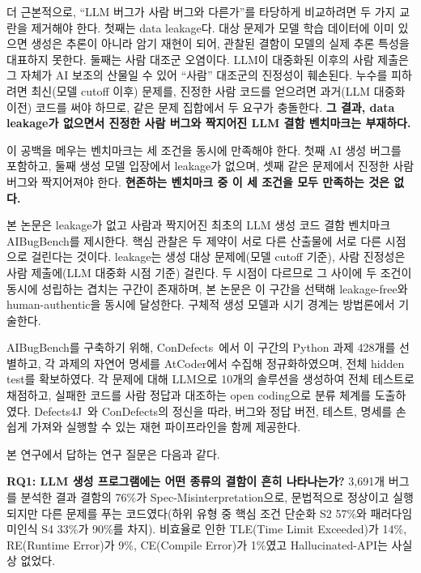 \documentclass[10pt,conference]{IEEEtran}
\begin{document}
더 근본적으로, ``LLM 버그가 사람 버그와 다른가''를 타당하게 비교하려면 두 가지 교란을 제거해야 한다. 첫째는 data leakage다. 대상 문제가 모델 학습 데이터에 이미 있으면 생성은 추론이 아니라 암기 재현이 되어, 관찰된 결함이 모델의 실제 추론 특성을 대표하지 못한다. 둘째는 사람 대조군 오염이다. LLM이 대중화된 이후의 사람 제출은 그 자체가 AI 보조의 산물일 수 있어 ``사람'' 대조군의 진정성이 훼손된다. 누수를 피하려면 최신(모델 cutoff 이후) 문제를, 진정한 사람 코드를 얻으려면 과거(LLM 대중화 이전) 코드를 써야 하므로, 같은 문제 집합에서 두 요구가 충돌한다. \textbf{그 결과, data leakage가 없으면서 진정한 사람 버그와 짝지어진 LLM 결함 벤치마크는 부재하다.}

이 공백을 메우는 벤치마크는 세 조건을 동시에 만족해야 한다. 첫째 AI 생성 버그를 포함하고, 둘째 생성 모델 입장에서 leakage가 없으며, 셋째 같은 문제에서 진정한 사람 버그와 짝지어져야 한다. \textbf{현존하는 벤치마크 중 이 세 조건을 모두 만족하는 것은 없다.}

본 논문은 leakage가 없고 사람과 짝지어진 최초의 LLM 생성 코드 결함 벤치마크 AIBugBench를 제시한다. 핵심 관찰은 두 제약이 서로 다른 산출물에 서로 다른 시점으로 걸린다는 것이다. leakage는 생성 대상 문제에(모델 cutoff 기준), 사람 진정성은 사람 제출에(LLM 대중화 시점 기준) 걸린다. 두 시점이 다르므로 그 사이에 두 조건이 동시에 성립하는 겹치는 구간이 존재하며, 본 논문은 이 구간을 선택해 leakage-free와 human-authentic을 동시에 달성한다. 구체적 생성 모델과 시기 경계는 방법론에서 기술한다.

AIBugBench를 구축하기 위해, ConDefects~\cite{wu2023condefects}에서 이 구간의 Python 과제 428개를 선별하고, 각 과제의 자연어 명세를 AtCoder에서 수집해 정규화하였으며, 전체 hidden test를 확보하였다. 각 문제에 대해 LLM으로 10개의 솔루션을 생성하여 전체 테스트로 채점하고, 실패한 코드를 사람 정답과 대조하는 open coding으로 분류 체계를 도출하였다. Defects4J~\cite{just2014defects4j}와 ConDefects의 정신을 따라, 버그와 정답 버전, 테스트, 명세를 손쉽게 가져와 실행할 수 있는 재현 파이프라인을 함께 제공한다.

본 연구에서 답하는 연구 질문은 다음과 같다.

\noindent\textbf{RQ1: LLM 생성 프로그램에는 어떤 종류의 결함이 흔히 나타나는가?} 3{,}691개 버그를 분석한 결과 결함의 76\%가 Spec-Misinterpretation으로, 문법적으로 정상이고 실행되지만 다른 문제를 푸는 코드였다(하위 유형 중 핵심 조건 단순화 S2 57\%와 패러다임 미인식 S4 33\%가 90\%를 차지). 비효율로 인한 TLE(Time Limit Exceeded)가 14\%, RE(Runtime Error)가 9\%, CE(Compile Error)가 1\%였고 Hallucinated-API는 사실상 없었다.
\end{document}
